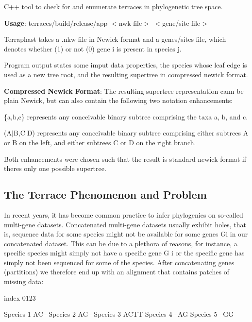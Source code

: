 C++ tool to check for and enumerate terraces in phylogenetic tree space. 



{\bfseries Usage}\+: {\ttfamily terraces/build/release/app $<$nwk file$>$ $<$gene/site file$>$}

Terraphast takes a .nkw file in Newick format and a genes/sites file, which denotes whether (1) or not (0) gene i is present in species j.

Program output states some imput data properties, the species whose leaf edge is used as a new tree root, and the resulting supertree in compressed newick format.

{\bfseries Compressed Newick Format}\+: The resulting supertree representation cann be plain Newick, but can also contain the following two notation enhancements\+:
\begin{DoxyItemize}
\item {\ttfamily \{a,b,c\}} represents any conceivable binary subtree comprising the taxa a, b, and c.
\item {\ttfamily (A$\vert$B,C$\vert$D)} represents any conceivable binary subtree comprising either subtrees A or B on the left, and either subtrees C or D on the right branch.
\end{DoxyItemize}

Both enhancements were chosen such that the result is standard newick format if there\textquotesingle{}s only one possible supertree.

\subsection*{The Terrace Phenomenon and Problem}

In recent years, it has become common practice to infer phylogenies on so-\/called multi-\/gene datasets. Concatenated multi-\/gene datasets usually exhibit holes, that is, sequence data for some species might not be available for some genes Gi in our concatenated dataset. This can be due to a plethora of reasons, for instance, a specific species might simply not have a specific gene G i or the specific gene has simply not been sequenced for some of the species. After concatenating genes (partitions) we therefore end up with an alignment that contains patches of missing data\+:


\begin{DoxyCode}
index       0123

Species 1   AC--
Species 2   AG--
Species 3   ACTT
Species 4   --AG
Species 5   --GG
\end{DoxyCode}


